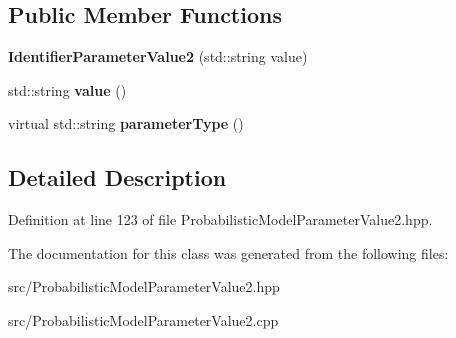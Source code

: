 \subsection*{Public Member Functions}
\begin{DoxyCompactItemize}
\item 
\mbox{\label{classtops_1_1IdentifierParameterValue2_a295760b68151a7c19c01c3b448c56724}} 
{\bfseries Identifier\+Parameter\+Value2} (std\+::string value)
\item 
\mbox{\label{classtops_1_1IdentifierParameterValue2_aff2db8fb5acd0f05a7e86f4f6190da83}} 
std\+::string {\bfseries value} ()
\item 
\mbox{\label{classtops_1_1IdentifierParameterValue2_a37e5e4d79a969c9a6766a1742defda8c}} 
virtual std\+::string {\bfseries parameter\+Type} ()
\end{DoxyCompactItemize}


\subsection{Detailed Description}


Definition at line 123 of file Probabilistic\+Model\+Parameter\+Value2.\+hpp.



The documentation for this class was generated from the following files\+:\begin{DoxyCompactItemize}
\item 
src/Probabilistic\+Model\+Parameter\+Value2.\+hpp\item 
src/Probabilistic\+Model\+Parameter\+Value2.\+cpp\end{DoxyCompactItemize}
